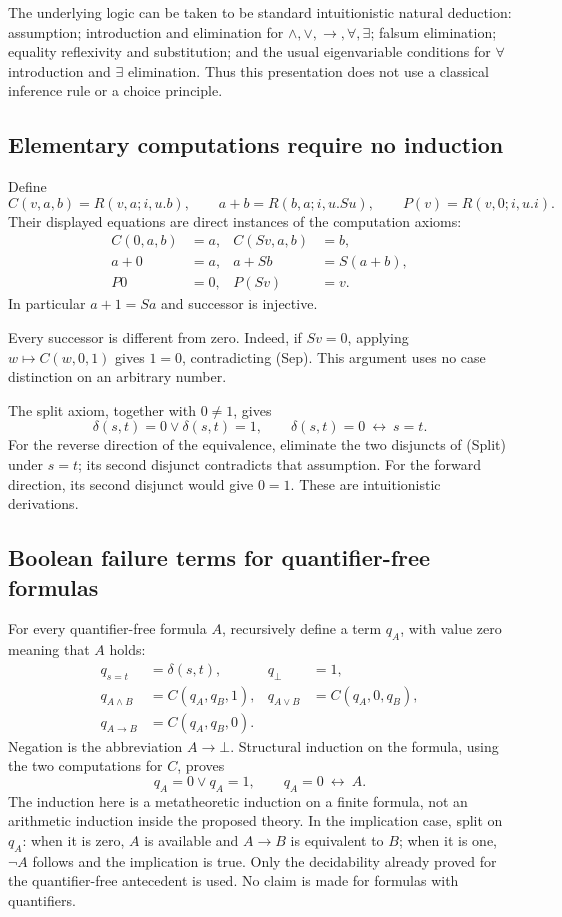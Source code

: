 The underlying logic can be taken to be standard intuitionistic natural
deduction: assumption; introduction and elimination for
$\land,\lor,\to,\forall,\exists$; falsum elimination; equality reflexivity
and substitution; and the usual eigenvariable conditions for
$\forall$ introduction and $\exists$ elimination.  Thus this presentation
does not use a classical inference rule or a choice principle.

\subsection{Elementary computations require no induction}

Define
\[
 C(v,a,b)=R(v,a;i,u.b),\qquad
 a+b=R(b,a;i,u.Su),\qquad
 P(v)=R(v,0;i,u.i).
\]
Their displayed equations are direct instances of the computation axioms:
\begin{align*}
 C(0,a,b)&=a,& C(Sv,a,b)&=b,\\
 a+0&=a,& a+Sb&=S(a+b),\\
 P0&=0,& P(Sv)&=v.
\end{align*}
In particular $a+1=Sa$ and successor is injective.

Every successor is different from zero.  Indeed, if $Sv=0$, applying
$w\mapsto C(w,0,1)$ gives $1=0$, contradicting \textup{(Sep)}.
This argument uses no case distinction on an arbitrary number.

The split axiom, together with $0\ne1$, gives
\[
 \delta(s,t)=0\lor\delta(s,t)=1,
 \qquad \delta(s,t)=0\ \longleftrightarrow\ s=t.
 \tag{E}\label{eq:const-eqreflection}
\]
For the reverse direction of the equivalence, eliminate the two
disjuncts of \textup{(Split)} under $s=t$; its second disjunct contradicts
that assumption.  For the forward direction, its second disjunct would
give $0=1$.  These are intuitionistic derivations.

\subsection{Boolean failure terms for quantifier-free formulas}

For every quantifier-free formula $A$, recursively define a term $q_A$,
with value zero meaning that $A$ holds:
\begin{align*}
 q_{s=t}&=\delta(s,t), &q_\bot&=1,\\
 q_{A\land B}&=C(q_A,q_B,1),
 &q_{A\lor B}&=C(q_A,0,q_B),\\
 q_{A\to B}&=C(q_A,q_B,0).
\end{align*}
Negation is the abbreviation $A\to\bot$.  Structural induction on the
formula, using the two computations for $C$, proves
\[
 q_A=0\lor q_A=1,
 \qquad q_A=0\ \longleftrightarrow\ A.
 \tag{B}\label{eq:const-boolean}
\]
The induction here is a metatheoretic induction on a finite formula, not
an arithmetic induction inside the proposed theory.  In the implication
case, split on $q_A$: when it is zero, $A$ is available and $A\to B$ is
equivalent to $B$; when it is one, $\neg A$ follows and the implication
is true.  Only the decidability already proved for the quantifier-free
antecedent is used.  No claim is made for formulas with quantifiers.


